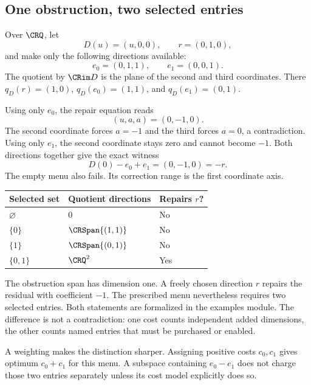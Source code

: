 \subsection{One obstruction, two selected entries}
\begin{CRexample}\label{CR:ex:menu}
Over $\CRQ$, let
\[
D(u)=(u,0,0),\qquad r=(0,1,0),
\]
and make only the following directions available:
\[
e_0=(0,1,1),\qquad e_1=(0,0,1).
\]
The quotient by $\CRim D$ is the plane of the second and third coordinates. There $q_D(r)=(1,0)$, $q_D(e_0)=(1,1)$, and $q_D(e_1)=(0,1)$.
\end{CRexample}

Using only $e_0$, the repair equation reads
\[
(u,a,a)=(0,-1,0).
\]
The second coordinate forces $a=-1$ and the third forces $a=0$, a contradiction. Using only $e_1$, the second coordinate stays zero and cannot become $-1$. Both directions together give the exact witness
\begin{equation}\label{CR:eq:two-entry-witness}
D(0)-e_0+e_1=(0,-1,0)=-r.
\end{equation}
The empty menu also fails. Its correction range is the first coordinate axis.

\begin{center}
\begin{tabular}{@{}lll@{}}
\toprule
Selected set & Quotient directions & Repairs $r$?\\
\midrule
$\varnothing$ & $0$ & No\\
$\{0\}$ & $\CRSpan\{(1,1)\}$ & No\\
$\{1\}$ & $\CRSpan\{(0,1)\}$ & No\\
$\{0,1\}$ & $\CRQ^2$ & Yes\\
\bottomrule
\end{tabular}
\end{center}

The obstruction span has dimension one. A freely chosen direction $r$ repairs the residual with coefficient $-1$. The prescribed menu nevertheless requires two selected entries. Both statements are formalized in the examples module. The difference is not a contradiction: one cost counts independent added dimensions, the other counts named entries that must be purchased or enabled.

A weighting makes the distinction sharper. Assigning positive costs $c_0,c_1$ gives optimum $c_0+c_1$ for this menu. A subspace containing $e_0-e_1$ does not charge those two entries separately unless its cost model explicitly does so.

